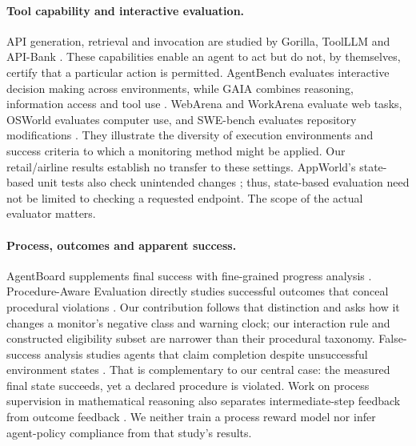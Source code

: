 \documentclass[10pt]{article}
\begin{document}
\paragraph{Tool capability and interactive evaluation.}
API generation, retrieval and invocation are studied by Gorilla, ToolLLM and API-Bank \citep{patil2023gorilla,qin2023toolllm,li2023apibank}. These capabilities enable an agent to act but do not, by themselves, certify that a particular action is permitted. AgentBench evaluates interactive decision making across environments, while GAIA combines reasoning, information access and tool use \citep{liu2023agentbench,mialon2023gaia}. WebArena and WorkArena evaluate web tasks, OSWorld evaluates computer use, and SWE-bench evaluates repository modifications \citep{zhou2023webarena,drouin2024workarena,xie2024osworld,jimenez2024swebench}. They illustrate the diversity of execution environments and success criteria to which a monitoring method might be applied. Our retail/airline results establish no transfer to these settings. AppWorld's state-based unit tests also check unintended changes \citep{trivedi2024appworld}; thus, state-based evaluation need not be limited to checking a requested endpoint. The scope of the actual evaluator matters.

\paragraph{Process, outcomes and apparent success.}
AgentBoard supplements final success with fine-grained progress analysis \citep{ma2024agentboard}. Procedure-Aware Evaluation directly studies successful outcomes that conceal procedural violations \citep{cao2026procedure}. Our contribution follows that distinction and asks how it changes a monitor's negative class and warning clock; our interaction rule and constructed eligibility subset are narrower than their procedural taxonomy. False-success analysis studies agents that claim completion despite unsuccessful environment states \citep{advani2026false}. That is complementary to our central case: the measured final state succeeds, yet a declared procedure is violated. Work on process supervision in mathematical reasoning also separates intermediate-step feedback from outcome feedback \citep{lightman2023verify}. We neither train a process reward model nor infer agent-policy compliance from that study's results.
\end{document}

